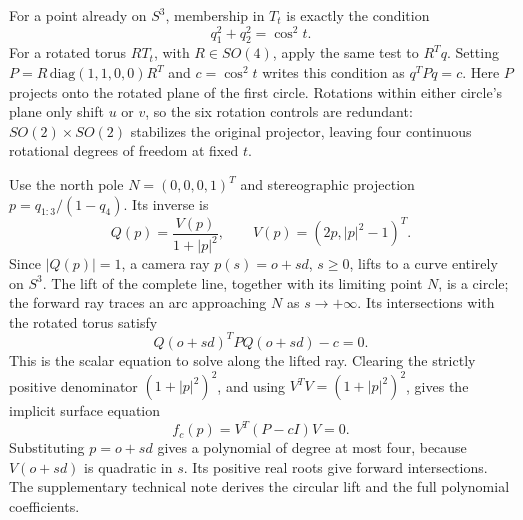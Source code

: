 \documentclass{jcgt}
\begin{document}
For a point already on \(S^3\), membership in \(T_t\) is exactly the
condition \[
q_1^2+q_2^2=\cos^2t.
\] For a rotated torus \(RT_t\), with \(R\in SO(4)\), apply the same
test to \(R^Tq\). Setting \(P=R\,\mathrm{diag}(1,1,0,0)R^T\) and
\(c=\cos^2t\) writes this condition as \(q^TPq=c\). Here \(P\) projects
onto the rotated plane of the first circle. Rotations within either
circle's plane only shift \(u\) or \(v\), so the six rotation controls
are redundant: \(SO(2)\times SO(2)\) stabilizes the original projector,
leaving four continuous rotational degrees of freedom at fixed \(t\).

Use the north pole \(N=(0,0,0,1)^T\) and stereographic projection
\(p=q_{1:3}/(1-q_4)\). Its inverse is \[
Q(p)=\frac{V(p)}{1+|p|^2},\qquad V(p)=(2p,|p|^2-1)^T.
\] Since \(|Q(p)|=1\), a camera ray \(p(s)=o+sd\), \(s\geq0\), lifts to
a curve entirely on \(S^3\). The lift of the complete line, together
with its limiting point \(N\), is a circle; the forward ray traces an
arc approaching \(N\) as \(s\to+\infty\). Its intersections with the
rotated torus satisfy \[
Q(o+sd)^TPQ(o+sd)-c=0.
\] This is the scalar equation to solve along the lifted ray. Clearing
the strictly positive denominator \((1+|p|^2)^2\), and using
\(V^TV=(1+|p|^2)^2\), gives the implicit surface equation \[
f_c(p)=V^T(P-cI)V=0.
\] Substituting \(p=o+sd\) gives a polynomial of degree at most four,
because \(V(o+sd)\) is quadratic in \(s\). Its positive real roots give
forward intersections. The supplementary technical note derives the
circular lift and the full polynomial coefficients.
\end{document}
